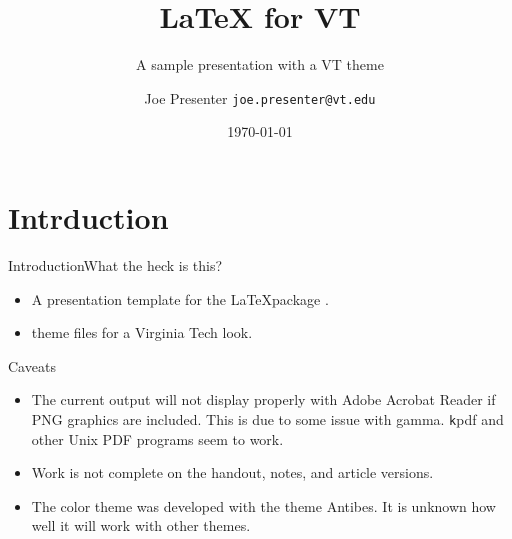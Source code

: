 %
%
%
%
\title[VT \BEAMER]{\LaTeX{ }\BEAMER for VT}
\subtitle{A sample presentation with a VT theme}
\author{Joe Presenter \texttt{joe.presenter@vt.edu}}
\date{\today}
\begin{frame}
\titlepage
\end{frame}
\section{Intrduction}
\begin{frame}{Introduction}{What the heck is this?}
\begin{itemize}
\item A presentation template for the \LaTeX package \BEAMER.
\item \BEAMER theme files for a Virginia Tech look.
\end{itemize}
\end{frame}
\begin{frame}{Caveats}
\begin{itemize}
\item The current output will not display properly with Adobe Acrobat Reader
if PNG graphics are included.  This is due to some issue with gamma.
{\texttt kpdf} and other Unix PDF programs seem to work.
\item Work is not complete on the handout, notes, and article versions.
\item The color theme was developed with the \BEAMER theme Antibes.  It is
unknown how well it will work with other themes.
\end{itemize}
\end{frame}
